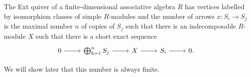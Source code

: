 The Ext quiver of a finite-dimensional associative algebra $R$ has vertices
labelled by isomorphism classes of simple $R$-modules and the number of arrows
$x\colon S_i\to S_j$ is the maximal number $n$ of copies of $S_j$ such that there
is an indecomposable $R$-module $X$ such that there is a short exact sequence
\[\begin{tikzcd}
	0\ar[r] & \bigoplus_{k=1}^n S_j\ar[r] & X\ar[r] & S_i\ar[r] & 0.
\end{tikzcd}\]

We will show later that this number is always finite.
